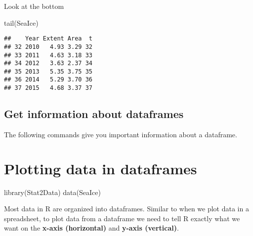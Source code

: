 \documentclass[
]{book}
\newenvironment{Shaded}{\begin{snugshade}}{\end{snugshade}}
\newcommand{\FunctionTok}[1]{\textcolor[rgb]{0.00,0.00,0.00}{#1}}
\newcommand{\NormalTok}[1]{#1}
\newcommand{\SpecialCharTok}[1]{\textcolor[rgb]{0.00,0.00,0.00}{#1}}
\begin{document}
Look at the bottom

\begin{Shaded}
\begin{Highlighting}[]
\FunctionTok{tail}\NormalTok{(SeaIce)}
\end{Highlighting}
\end{Shaded}

\begin{verbatim}
##    Year Extent Area  t
## 32 2010   4.93 3.29 32
## 33 2011   4.63 3.18 33
## 34 2012   3.63 2.37 34
## 35 2013   5.35 3.75 35
## 36 2014   5.29 3.70 36
## 37 2015   4.68 3.37 37
\end{verbatim}

\hypertarget{get-information-about-dataframes}{%
\section{Get information about dataframes}\label{get-information-about-dataframes}}

The following commands give you important information about a dataframe.

\begin{Shaded}
\end{Shaded}

\hypertarget{plotting-data-in-dataframes}{%
\chapter{Plotting data in dataframes}\label{plotting-data-in-dataframes}}

\begin{Shaded}
\begin{Highlighting}[]
\FunctionTok{library}\NormalTok{(Stat2Data)}
\FunctionTok{data}\NormalTok{(SeaIce)}
\end{Highlighting}
\end{Shaded}

Most data in R are organized into dataframes. Similar to when we plot data in a spreadsheet, to plot data from a dataframe we need to tell R exactly what we want on the \textbf{x-axis (horizontal)} and \textbf{y-axis (vertical)}.
\end{document}
